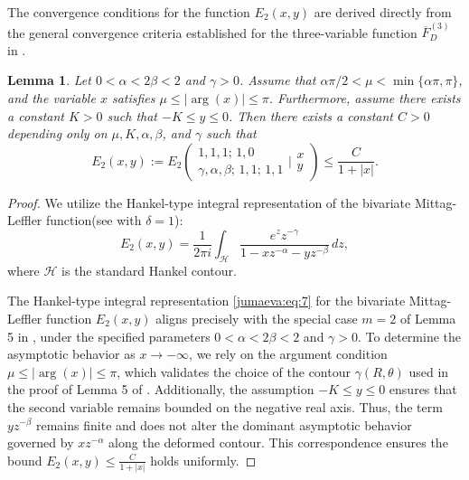 \documentclass{amsart}
\numberwithin{equation}{section}
\newtheorem{lem}[thm]{Lemma}
\begin{document}
The convergence conditions for the function $E_2(x,y)$ are derived directly from the general convergence criteria established for the three-variable function $\overline{F}_D^{(3)}$ in \cite{jumaeva:ref:30}.

\begin{lem}
Let $0 < \alpha <2\beta < 2$ and $\gamma > 0$. Assume that $\alpha\pi/2 < \mu < \min\{\alpha\pi, \pi\}$, and the variable $x$ satisfies $\mu \le |\arg(x)| \le \pi$. Furthermore, assume there exists a constant $K > 0$ such that $-K \le y \le 0$. Then there exists a constant $C>0$ depending only on $\mu, K, \alpha, \beta$, and $\gamma$ such that
\begin{equation*}
E_2(x,y) := E_{2}\!\left(
\begin{array}{c}
1, 1, 1;\, 1, 0\\
\gamma, \alpha, \beta;\, 1, 1;\, 1, 1
\end{array}
\Bigg|\begin{array}{c} x\\ y\end{array}\right) \le \frac{C}{1+|x|}.
\end{equation*}\label{jumaeva:lem:4}
\end{lem}
\begin{proof}
We utilize the Hankel-type integral representation of the bivariate Mittag-Leffler function(see \cite{jumaeva:ref:31} with $\delta=1$):
\begin{equation}
E_2(x,y) = \frac{1}{2\pi i} \int_{\mathcal{H}} \frac{e^{z} z^{-\gamma}}{1 - xz^{-\alpha} - yz^{-\beta}} \, dz,\label{jumaeva:eq:7}
\end{equation}
where $\mathcal{H}$ is the standard Hankel contour. 

The Hankel-type integral representation \eqref{jumaeva:eq:7} for the bivariate Mittag-Leffler function $  E_2(x, y)  $ aligns precisely with the special case $  m=2  $ of Lemma 5 in \cite{jumaeva:ref:32}, under the specified parameters $  0 < \alpha <2\beta< 2  $  and $  \gamma>0  $. To determine the asymptotic behavior as $x \to -\infty$, we rely on the argument condition $\mu \le |\arg(x)| \le \pi$, which validates the choice of the contour $\gamma(R, \theta)$ used in the proof of Lemma 5 of \cite{jumaeva:ref:32}. Additionally, the assumption $-K \le y \le 0$ ensures that the second variable remains bounded on the negative real axis. Thus, the term $yz^{-\beta}$ remains finite and does not alter the dominant asymptotic behavior governed by $xz^{-\alpha}$ along the deformed contour.  This correspondence ensures the bound $E_2(x, y) \leq \frac{C}{1 + |x|}$ holds uniformly.
\end{proof}
\end{document}

